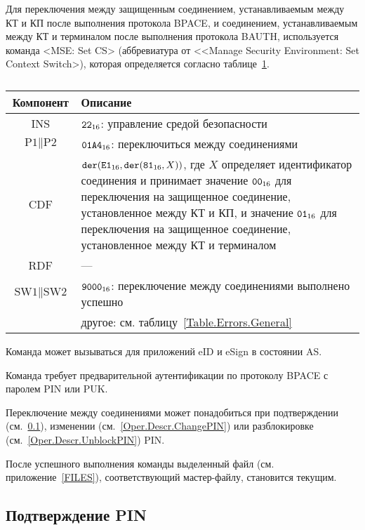 Для переключения между защищенным соединением,
устанавливаемым между КТ и КП после выполнения 
протокола BPACE, и соединением, 
устанавливаемым между КТ и терминалом после выполнения 
протокола BAUTH, используется 
команда <MSE: Set CS> (аббревиатура от <<Manage Security Environment: Set 
Context Switch>),
которая определяется согласно 
таблице~\ref{Table.Oper.SetCSCmd}.

\begin{table}[hbt]
\caption{}\label{Table.Oper.SetCSCmd}
\begin{tabular}{|c|p{14cm}|}
\hline
Компонент & Описание \\
\hline
\hline
INS & $\texttt{22}_{16}$: управление средой безопасности\\ 
\hline
$\text{P1} \parallel\text{P2}$ & $\texttt{01A4}_{16}$: 
переключиться между соединениями \\
\hline
CDF & 
$\texttt{der}(\texttt{E1}_{16}, \texttt{der}(\texttt{81}_{16}, X))$, 
где $X$ определяет идентификатор
соединения и принимает значение $\texttt{00}_{16}$ для
переключения на защищенное соединение,
установленное между КТ и КП,
и значение $\texttt{01}_{16}$ для переключения на защищенное
соединение, установленное между КТ и терминалом\\ 
\hline 
RDF &  --- \\
\hline
$\text{SW1} \parallel \text{SW2}$ & 
$\texttt{9000}_{16}$: переключение между соединениями выполнено успешно \\
 & другое: см. таблицу~\ref{Table.Errors.General} \\
\hline
\end{tabular}
\end{table}

Команда может вызываться для приложений eID и eSign
в состоянии AS.

Команда требует предварительной аутентификации по протоколу BPACE
с паролем PIN или PUK.

Переключение между соединениями может понадобиться
при подтверждении (см.~\ref{Oper.Descr.VerifyPIN}), 
изменении (см.~\ref{Oper.Descr.ChangePIN})
или разблокировке (см.~\ref{Oper.Descr.UnblockPIN}) PIN.

После успешного выполнения команды выделенный файл (см.
приложение~\ref{FILES}), 
соответствующий мастер-файлу, становится текущим.

\subsection{Подтверждение PIN}
\label{Oper.Descr.VerifyPIN}

